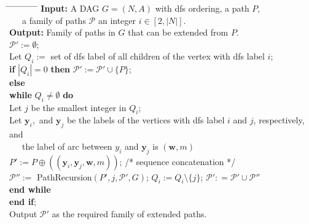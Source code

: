 \documentclass[12pt]{article}
\newcommand{\w}{\pmb{w}}
\newcommand{\y}{\pmb{y}}
\newcommand{\1}{\pmb{1}}
\newcommand{\0}{\pmb{0}}
\begin{document}
\bigskip
{}
\begin{tabbing}
\hspace{3mm} \= \hspace{3mm} \= \hspace{3mm} \= \hspace{3mm} \= %
\hspace{3mm} \= \hspace{3mm} \= \hspace{3mm} \= \hspace{3mm} \= %
\hspace{3mm} \= \hspace{3mm} \= \hspace{3mm} \= \hspace{3mm}  \kill
{\bf Input: } A DAG $G = (N, A)$ with dfs ordering, a path $P$,\\
~~~a family of paths $\mathcal{P}$ 
an integer $i \in [2, |N|]$.\\
%
{\bf Output: } Family  of paths in $G$ that can be extended from 
$P$.\\
$\mathcal{P}' := \emptyset$;\\
Let $Q_i :=$ set of dfs label of all children of the vertex with dfs label $i$;\\
{\bf if} $|Q_i| = 0$ {\bf then} $\mathcal{P}' := \mathcal{P}' \cup \{P\}$;\\
{\bf else}\+ \\
	{\bf while} $Q_i \neq \emptyset$ {\bf do} \+ \\
		Let $j$ be the smallest integer in $Q_i$;\\
		Let $\y_i,$  and $\y_j$ be the labels of the vertices with 
		dfs label $i$ and $j$, respectively, and\\
		 ~~~the label of arc between $y_i$ and $\y_j$ is 
		 $(\w, m)$\\
		$P':= P \oplus ((\y_i, \y_j, \w, m))$;
		/* sequence concatenation */\\ 
		$\mathcal{P''}:=$ PathRecursion$(P', j, \mathcal{P}', G)$;
		$Q_i := Q_i \setminus \{j\}$;
		$\mathcal{P'}: = \mathcal{P'} \cup \mathcal{P''}$ \- \\		
	{\bf end while}\-\\
{\bf end if};\\
Output $\mathcal{P}'$ as the required family of extended paths.
\end{tabbing}

% 
% 
\end{document}
